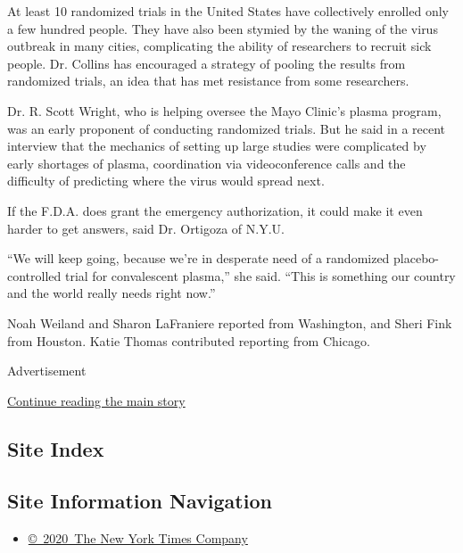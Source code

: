 At least 10 randomized trials in the United States have collectively
enrolled only a few hundred people. They have also been stymied by the
waning of the virus outbreak in many cities, complicating the ability of
researchers to recruit sick people. Dr. Collins has encouraged a
strategy of pooling the results from randomized trials, an idea that has
met resistance from some researchers.

Dr. R. Scott Wright, who is helping oversee the Mayo Clinic's plasma
program, was an early proponent of conducting randomized trials. But he
said in a recent interview that the mechanics of setting up large
studies were complicated by early shortages of plasma, coordination via
videoconference calls and the difficulty of predicting where the virus
would spread next.

If the F.D.A. does grant the emergency authorization, it could make it
even harder to get answers, said Dr. Ortigoza of N.Y.U.

``We will keep going, because we're in desperate need of a randomized
placebo-controlled trial for convalescent plasma,'' she said. ``This is
something our country and the world really needs right now.''

Noah Weiland and Sharon LaFraniere reported from Washington, and Sheri
Fink from Houston. Katie Thomas contributed reporting from Chicago.

Advertisement

\protect\hyperlink{after-bottom}{Continue reading the main story}

\hypertarget{site-index}{%
\subsection{Site Index}\label{site-index}}

\hypertarget{site-information-navigation}{%
\subsection{Site Information
Navigation}\label{site-information-navigation}}

\begin{itemize}
\tightlist
\item
  \href{https://help.nytimes3xbfgragh.onion/hc/en-us/articles/115014792127-Copyright-notice}{©~2020~The
  New York Times Company}
\end{itemize}

